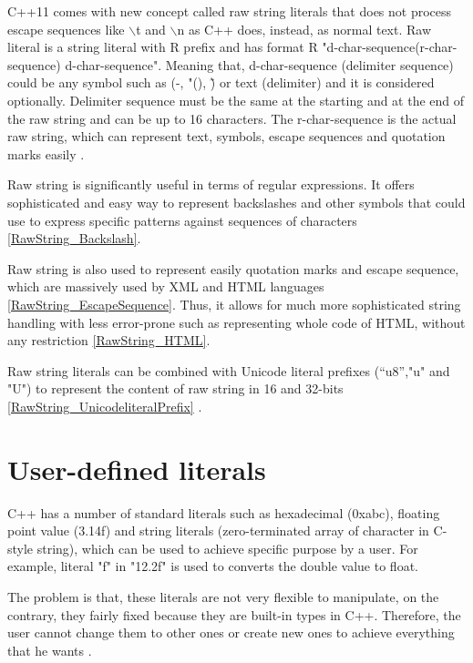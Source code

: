 \documentclass[11pt]{report}
\begin{document}
C++11 comes with new concept called raw string literals that does not process escape sequences like $\backslash$t and $\backslash$n as C++ does, instead, as normal text. Raw literal is a string literal with R prefix and has format R "d-char-sequence(r-char-sequence) d-char-sequence". Meaning that, d-char-sequence (delimiter sequence) could be any symbol such as (-, "(), \~) or text (delimiter) and it is considered optionally. Delimiter sequence must be the same at the starting and at the end of the raw string and can be up to 16 characters. The r-char-sequence is the actual raw string, which can represent text, symbols, escape sequences and quotation marks easily \cite{Gregorie:professionalcpp}.


Raw string is significantly useful in terms of regular expressions. It offers sophisticated and easy way to represent backslashes and other symbols that could use to express specific patterns against sequences of characters \ref{RawString_Backslash}.


Raw string is also used to represent easily quotation marks and escape sequence, which are massively used by XML and HTML languages \ref{RawString_EscapeSequence}. Thus, it allows for much more sophisticated string handling with less error-prone such as representing whole code of HTML, without any restriction \ref{RawString_HTML}.


Raw string literals can be combined with Unicode literal prefixes  (“u8”,"u" and "U") to represent the content of raw string in 16 and 32-bits \ref{RawString_UnicodeliteralPrefix} \cite{Gregorie:professionalcpp}.

\section{User-defined literals}
\label{section: User-defined literals}
C++ has a number of standard literals such as hexadecimal (0xabc), floating point value (3.14f) and string literals (zero-terminated array of character in C-style string), which can be used to achieve specific purpose by a user. For example, literal "f" in "12.2f" is used to converts the double value to float. 


The problem is that, these literals are not very flexible to manipulate, on the contrary, they fairly fixed because they are built-in types in C++. Therefore, the user cannot change them to other ones or create new ones to achieve everything that he wants \cite{Overland:2011:CWF}.
\end{document}
